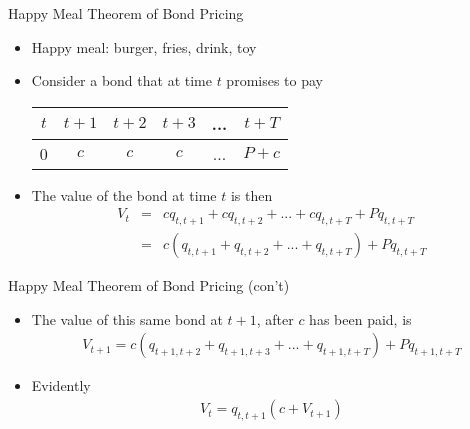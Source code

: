 \documentclass[professionalfonts,small]{beamer}
\begin{document}
\begin{frame}{Happy Meal Theorem of Bond Pricing}

\begin{itemize}

\item Happy meal: burger, fries, drink, toy

\medskip

\item Consider a bond that at time $t$ promises to pay
\begin{center}
\begin{tabular}{cccccc}
  $t$    &   $t+1$   &  $t+2$  &  $t+3$   & ...  & $t+T$  \\
\hline
   0      &    $c$    &   $c$   &   $c$    &  ... & $P+c$   \\
\end{tabular}
\end{center}

\medskip

\item The value of the bond at time $t$ is then
\begin{eqnarray*}
V_t &=& c q_{t,t+1} + c q_{t,t+2} +  ... + c q_{t,t+T} + P q_{t,t+T} \\
    &=& c (q_{t,t+1} + q_{t,t+2} +  ... + q_{t,t+T}) + P q_{t,t+T}
\end{eqnarray*}

\end{itemize}

\end{frame}

\begin{frame}{Happy Meal Theorem of Bond Pricing (con't)}

\begin{itemize}

\item The value of this same bond at $t+1$, after $c$ has been paid, is
\begin{eqnarray*}
V_{t+1}  = c (q_{t+1,t+2} + q_{t+1,t+3} +  ... + q_{t+1,t+T}) + P q_{t+1,t+T}
\end{eqnarray*}

\medskip

\item Evidently
\begin{eqnarray*}
V_t = q_{t,t+1} \left( c + V_{t+1} \right)
\end{eqnarray*}

\end{itemize}

\end{frame}
\end{document}
